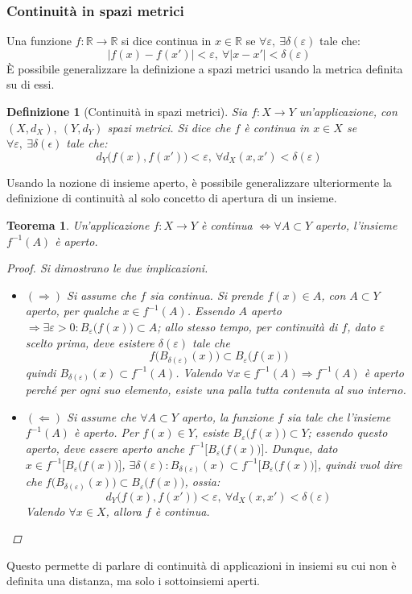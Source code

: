 \documentclass[11pt, a4paper]{scrartcl}
\theoremstyle{style1}
\newtheorem{teorema}{Teorema}[section]
\newtheorem{definizione}{Definizione}[section]
\numberwithin{equation}{subsection}
\begin{document}
\subsubsection{Continuit\`a in spazi metrici}
Una funzione $f:\mathbb{R}\to \mathbb{R}$ si dice continua in $x \in \mathbb{R}$ se $\forall \varepsilon , \ \exists \delta (\varepsilon )$ tale che:
\[
\lvert f(x) - f(x') \rvert < \varepsilon, \ \forall \lvert x-x' \rvert < \delta (\varepsilon )
\] 
\`E possibile generalizzare la definizione a spazi metrici usando la metrica definita su di essi.
\begin{definizione}
	[Continuit\`a in spazi metrici]
Sia $f : X\to Y$ un'applicazione, con $(X,d_X) , \ (Y,d_Y)$ spazi metrici. Si dice che $f$ \`e continua in $x \in X$ se $\forall \varepsilon , \ \exists \delta (\epsilon )$ tale che:
\begin{equation}
	d_Y \big(f(x), f(x')\big) < \varepsilon , \ \forall d_X(x,x')< \delta (\varepsilon )
\end{equation}
\end{definizione}
\noindent Usando la nozione di insieme aperto, \`e possibile generalizzare ulteriormente la definizione di continuit\`a al solo concetto di apertura di un insieme.
\begin{teorema}
Un'applicazione $f:X\to Y$ \`e continua $\iff\forall A \subset  Y$ aperto, l'insieme $f^{-1}(A)  $ \`e aperto.
\begin{proof}
Si dimostrano le due implicazioni.	
\begin{itemize}
	\item $(\Rightarrow )$ Si assume che $f$ sia continua. Si prende $f(x) \in A$, con $A\subset Y$ aperto, per qualche $x \in f^{-1} (A)$. Essendo $A$ aperto $\Rightarrow \exists \varepsilon >0 : B_\varepsilon \big(f(x)\big)\subset A$; allo stesso tempo, per continuit\`a di $f$, dato $\varepsilon $ scelto prima, deve esistere $\delta (\varepsilon )$ tale che
		\[
		f\big(B_{\delta (\varepsilon )}(x)\big) \subset B_\varepsilon \big(f(x)\big)
		\] 
	quindi $B_{\delta (\varepsilon )} (x) \subset f^{-1} (A)$. Valendo $\forall x \in f^{-1} (A)\Rightarrow f^{-1} (A)$ \`e aperto perch\'e per ogni suo elemento, esiste una palla tutta contenuta al suo interno.
\item $(\Leftarrow)$ Si assume che $\forall A \subset Y$ aperto, la funzione $f$ sia tale che l'insieme $f^{-1} (A)$ \`e aperto. Per $f(x) \in Y$, esiste $B_\varepsilon \big(f(x)\big) \subset Y$; essendo questo aperto, deve essere aperto anche $f^{-1} \big[B_\varepsilon \big(f(x)\big) \big]$. 
	Dunque, dato $x \in f^{-1} \big[B_\varepsilon \big(f(x)\big) \big] $, $\exists \delta (\varepsilon ) : B_{\delta (\varepsilon )} (x) \subset f^{-1} \big[B_\varepsilon \big(f(x)\big) \big]$, quindi vuol dire che $f\big(B_{\delta (\varepsilon )} (x)\big)\subset B_\varepsilon \big(f(x)\big)$, ossia:
	\[
	d_Y\big(f(x), f(x')\big) < \varepsilon , \ \forall d_X (x,x') < \delta (\varepsilon )
	\] 
Valendo $\forall x \in X$, allora $f$ \`e continua.
\end{itemize}
\end{proof}
\end{teorema}
\noindent Questo permette di parlare di continuit\`a di applicazioni in insiemi su cui non \`e definita una distanza, ma solo i sottoinsiemi aperti.
\end{document}
